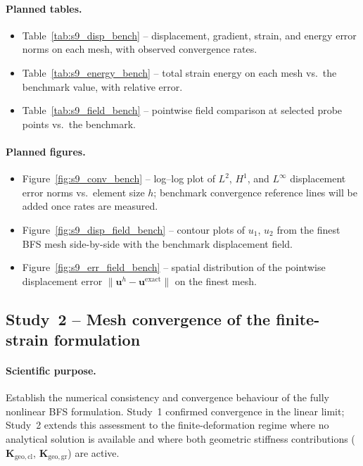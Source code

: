 \documentclass[11pt]{article}
\begin{document}
\paragraph{Planned tables.}
\begin{itemize}
  \item Table~\ref{tab:s9_disp_bench} -- displacement, gradient,
    strain, and energy error norms on each mesh, with observed
    convergence rates.
  \item Table~\ref{tab:s9_energy_bench} -- total strain energy on
    each mesh vs.\ the benchmark value, with relative error.
  \item Table~\ref{tab:s9_field_bench} -- pointwise field
    comparison at selected probe points vs.\ the benchmark.
\end{itemize}

\paragraph{Planned figures.}
\begin{itemize}
  \item Figure~\ref{fig:s9_conv_bench} -- log--log plot of $L^2$,
    $H^1$, and $L^\infty$ displacement error norms vs.\ element
    size $h$; benchmark convergence reference lines will be added
    once rates are measured.
  \item Figure~\ref{fig:s9_disp_field_bench} -- contour plots of
    $u_1$, $u_2$ from the finest BFS mesh side-by-side with the
    benchmark displacement field.
  \item Figure~\ref{fig:s9_err_field_bench} -- spatial distribution
    of the pointwise displacement error
    $\|\mathbf{u}^{h}-\mathbf{u}^{\mathrm{exact}}\|$ on the finest
    mesh.
\end{itemize}

\subsection{Study~2 -- Mesh convergence of the finite-strain formulation}
\label{ssec:s9_study2}

\paragraph{Scientific purpose.}
Establish the numerical consistency and convergence behaviour of the
fully nonlinear BFS formulation.  Study~1 confirmed convergence in
the linear limit; Study~2 extends this assessment to the
finite-deformation regime where no analytical solution is
available and where both geometric stiffness contributions
($\mathbf{K}_{\mathrm{geo,cl}}$, $\mathbf{K}_{\mathrm{geo,gr}}$)
are active.
\end{document}
